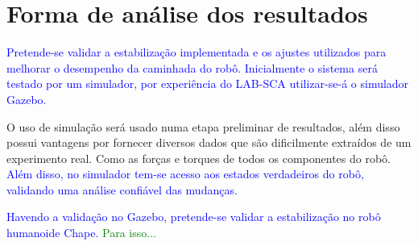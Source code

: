 \section{Forma de análise dos resultados}

\textcolor{blue}{Pretende-se validar a estabilização implementada e os ajustes utilizados para melhorar o desempenho da caminhada do robô. Inicialmente o sistema será testado por um simulador, por experiência do LAB-SCA utilizar-se-á o simulador Gazebo.}





O uso de simulação será usado numa etapa preliminar de resultados, além disso possui vantagens por fornecer diversos dados que são dificilmente extraídos de um experimento real. Como as forças e torques de todos os componentes do robô. \textcolor{blue}{Além disso, no simulador tem-se acesso aos estados verdadeiros do robô, validando uma análise confiável das mudanças.}

\textcolor{blue}{Havendo a validação no Gazebo, pretende-se validar a estabilização no robô humanoide Chape.} \textcolor{green}{ Para isso...}





\newpage



\printbibliography
